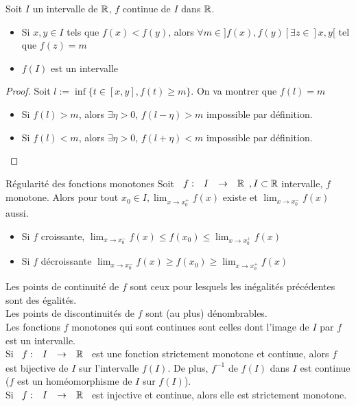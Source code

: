 \documentclass[]{report}
\begin{document}
\begin{prop}{}{}
    Soit $I$ un intervalle de $\mathbb{R}$, $f$ continue de $I$ dans $\mathbb{R}$.
    \begin{itemize}
        \item Si $x,y\in I$ tels que $f(x)<f(y)$, alors $\forall m\in ]f(x),f(y)[\exists z\in ]x,y[$ tel que $f(z)=m$
        \item $f(I)$ est un intervalle
    \end{itemize}
\end{prop}

\begin{proof}{}{}
    Soit $l:= \inf \{ t\in [x,y], f(t)\ge m\}$. On va montrer que $f(l)=m$
    \begin{itemize}
        \item Si $f(l)>m$, alors $\exists \eta >0$, $f(l-\eta)>m$ impossible par définition.
        \item Si $f(l)<m$, alors $\exists \eta >0$, $f(l+\eta)<m$ impossible par définition.
    \end{itemize}
\end{proof}

\begin{tm}{Régularité des fonctions monotones}{}
    Soit $\begin{array}{ccccc} f : & I & \to & \mathbb{R} \end{array},I\subset \mathbb{R}$ intervalle, $f$ monotone. Alors pour tout $x_0\in I,\lim_{x\to x_0^+} f(x)$ existe et $\lim_{x\to x_0^-} f(x)$ aussi.
    \begin{itemize}
        \item Si $f$ croissante, $\lim_{x\to x_0^-} f(x)\le f(x_0) \le \lim_{x\to x_0^+} f(x)$
        \item Si $f$ décroissante $\lim_{x\to x_0^-} f(x) \ge f(x_0) \ge \lim_{x\to x_0^+} f(x)$
    \end{itemize}
    Les points de continuité de $f$ sont ceux pour lesquels les inégalités précédentes sont des égalités.\\
    Les points de discontinuités de $f$ sont (au plus) dénombrables.\\
    Les fonctions $f$ monotones qui sont continues sont celles dont l'image de $I$ par $f$ est un intervalle.\\
    Si $\begin{array}{ccccc} f : & I & \to & \mathbb{R} \end{array}$ est une fonction strictement monotone et continue, alors $f$ est bijective de $I$ sur l'intervalle $f(I)$. De plus, $f^{-1}$ de $f(I)$ dans $I$ est continue ($f$ est un homéomorphisme de $I$ sur $f(I)$).\\
    Si $\begin{array}{ccccc} f : & I & \to & \mathbb{R} \end{array}$ est injective et continue, alors elle est strictement monotone.
\end{tm}
\end{document}
